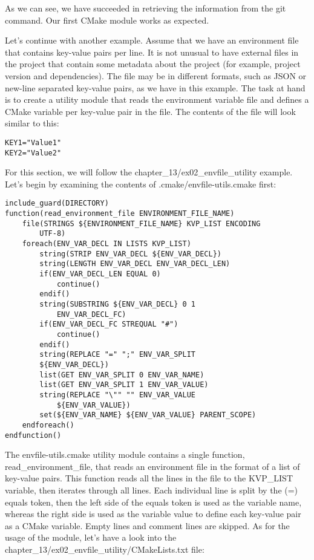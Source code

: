 As we can see, we have succeeded in retrieving the information from the git command. Our first CMake module works as expected.


Let's continue with another example. Assume that we have an environment file that contains key-value pairs per line. It is not unusual to have external files in the project that contain some metadata about the project (for example, project version and dependencies). The file may be in different formats, such as JSON or new-line separated key-value pairs, as we have in this example. The task at hand is to create a utility module that reads the environment variable file and defines a CMake variable per key-value pair in the file. The contents of the file will look similar to this:

\begin{lstlisting}[style=styleCMake]
KEY1="Value1"
KEY2="Value2"
\end{lstlisting}

For this section, we will follow the chapter\_13/ex02\_envfile\_utility example. Let's begin by examining the contents of .cmake/envfile-utils.cmake first:

\begin{lstlisting}[style=styleCMake]
include_guard(DIRECTORY)
function(read_environment_file ENVIRONMENT_FILE_NAME)
	file(STRINGS ${ENVIRONMENT_FILE_NAME} KVP_LIST ENCODING
		UTF-8)
	foreach(ENV_VAR_DECL IN LISTS KVP_LIST)
		string(STRIP ENV_VAR_DECL ${ENV_VAR_DECL})
		string(LENGTH ENV_VAR_DECL ENV_VAR_DECL_LEN)
		if(ENV_VAR_DECL_LEN EQUAL 0)
			continue()
		endif()
		string(SUBSTRING ${ENV_VAR_DECL} 0 1
			ENV_VAR_DECL_FC)
		if(ENV_VAR_DECL_FC STREQUAL "#")
			continue()
		endif()
		string(REPLACE "=" ";" ENV_VAR_SPLIT
		${ENV_VAR_DECL})
		list(GET ENV_VAR_SPLIT 0 ENV_VAR_NAME)
		list(GET ENV_VAR_SPLIT 1 ENV_VAR_VALUE)
		string(REPLACE "\"" "" ENV_VAR_VALUE
			${ENV_VAR_VALUE})
		set(${ENV_VAR_NAME} ${ENV_VAR_VALUE} PARENT_SCOPE)
	endforeach()
endfunction()
\end{lstlisting}

The envfile-utils.cmake utility module contains a single function, read\_environment\_file, that reads an environment file in the format of a list of key-value pairs. This function reads all the lines in the file to the KVP\_LIST variable, then iterates through all lines. Each individual line is split by the (=) equals token, then the left side of the equals token is used as the variable name, whereas the right side is used as the variable value to define each key-value pair as a CMake variable. Empty lines and comment lines are skipped. As for the usage of the module, let's have a look into the chapter\_13/ex02\_envfile\_utility/CMakeLists.txt file:


